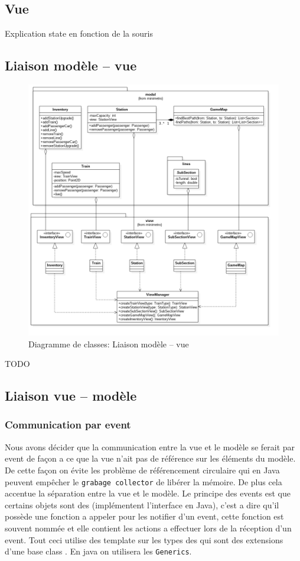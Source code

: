 \documentclass[report, backcover, french, nodocumentinfo]{upmethodology-document}
\begin{document}
		\subsection{Vue}
			Explication state en fonction de la souris
		\subsection{Liaison modèle -- vue}
			\begin{figure}[h!]
				\centering
				\includegraphics[width=\textwidth]{figures/ModelViewLinkClassDiagram}
				\caption{Diagramme de classes: Liaison modèle -- vue}
				\label{fig:ModelViewLinkClassDiagram}
			\end{figure}
			TODO
		\subsection{Liaison vue -- modèle}
			\subsubsection{Communication par event}
					Nous avons décider que la communication entre la vue et le modèle se ferait par event de façon a ce que la vue n'ait pas de référence sur les éléments du modèle. De cette façon on évite les problème de référencement circulaire qui en Java peuvent empêcher le \texttt{grabage collector} de libérer la mémoire. De plus cela accentue la séparation entre la vue et le modèle.
					Le principe des events est que certains objets sont des  (implémentent l'interface en Java), c'est a dire qu'il possède une fonction a appeler pour les notifier d'un event, cette fonction est souvent nommée  et elle contient les actions a effectuer lors de la réception d'un event. Tout ceci utilise des template sur les types des  qui sont des extensions d'une base class . En java on utilisera les \texttt{Generics}.
\end{document}
